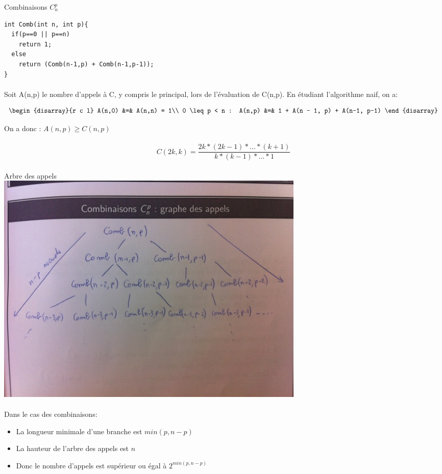 \begin{exercice}{Combinaisons $C_n^p$}

\begin{verbatim}
int Comb(int n, int p){
  if(p==0 || p==n)
    return 1;
  else
    return (Comb(n-1,p) + Comb(n-1,p-1));
}
 \end{verbatim}

\paragraph{}
Soit A(n,p) le nombre d'appels à C, y compris le principal, lors de l'évaluation de C(n,p).
En étudiant l'algorithme naif, on a:

\[
\begin{disarray}{r c l}
A(n,0) &=& A(n,n) = 1\\
0 \leq p < n : A(n,p) &=& 1 + A(n - 1, p) + A(n-1, p-1)
\end{disarray}
\]

On a donc : $A(n,p) \geq C(n,p)$\\\\

\[
 C(2k, k) = \frac{2k*(2k-1)*...*(k+1)}{k*(k-1)*...*1}
\]

\paragraph{}
Arbre des appels\\
\includegraphics[width=15cm]{combinaison_appels}

\paragraph{}
Dans le cas des combinaisons:
\begin{itemize}
 \item La longueur minimale d'une branche est $min(p, n-p)$
 \item La hauteur de l'arbre des appels est $n$
 \item Donc le nombre d'appels est supérieur ou égal à $2^{min(p, n-p)}$
\end{itemize}


\end{exercice}
